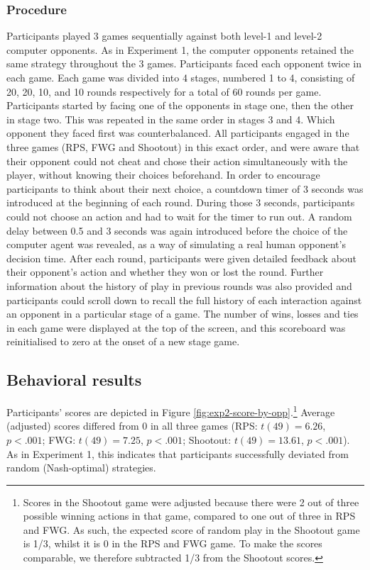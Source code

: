 \documentclass[smallextended]{svjour3}       %
\begin{document}
\hypertarget{procedure-1}{%
\subsubsection{Procedure}\label{procedure-1}}

Participants played 3 games sequentially against both level-1 and
level-2 computer opponents. As in Experiment 1, the computer opponents
retained the same strategy throughout the 3 games. Participants faced
each opponent twice in each game. Each game was divided into 4 stages,
numbered 1 to 4, consisting of 20, 20, 10, and 10 rounds respectively
for a total of 60 rounds per game. Participants started by facing one of
the opponents in stage one, then the other in stage two. This was
repeated in the same order in stages 3 and 4. Which opponent they faced
first was counterbalanced. All participants engaged in the three games
(RPS, FWG and Shootout) in this exact order, and were aware that their
opponent could not cheat and chose their action simultaneously with the
player, without knowing their choices beforehand. In order to encourage
participants to think about their next choice, a countdown timer of 3
seconds was introduced at the beginning of each round. During those 3
seconds, participants could not choose an action and had to wait for the
timer to run out. A random delay between 0.5 and 3 seconds was again
introduced before the choice of the computer agent was revealed, as a
way of simulating a real human opponent's decision time. After each
round, participants were given detailed feedback about their opponent's
action and whether they won or lost the round. Further information about
the history of play in previous rounds was also provided and
participants could scroll down to recall the full history of each
interaction against an opponent in a particular stage of a game. The
number of wins, losses and ties in each game were displayed at the top
of the screen, and this scoreboard was reinitialised to zero at the
onset of a new stage game.

\hypertarget{behavioral-results-1}{%
\subsection{Behavioral results}\label{behavioral-results-1}}

Participants' scores are depicted in Figure
\ref{fig:exp2-score-by-opp}.\footnote{Scores in the Shootout game were
  adjusted because there were 2 out of three possible winning actions in
  that game, compared to one out of three in RPS and FWG. As such, the
  expected score of random play in the Shootout game is 1/3, whilst it
  is 0 in the RPS and FWG game. To make the scores comparable, we
  therefore subtracted 1/3 from the Shootout scores.} Average (adjusted)
scores differed from 0 in all three games (RPS: \(t(49) = 6.26\),
\(p < .001\); FWG: \(t(49) = 7.25\), \(p < .001\); Shootout:
\(t(49) = 13.61\), \(p < .001\)). As in Experiment 1, this indicates
that participants successfully deviated from random (Nash-optimal)
strategies.
\end{document}
